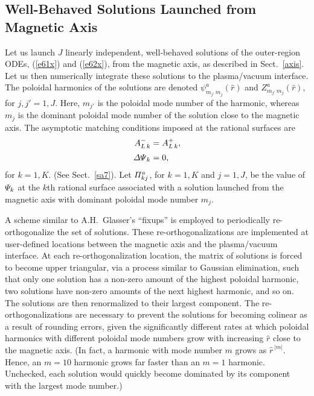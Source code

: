 \documentclass[12pt,prb,aps]{revtex4-1}
\begin{document}
\subsection{Well-Behaved Solutions Launched from Magnetic Axis}\label{axisl}
Let us launch $J$ linearly independent, well-behaved solutions of the outer-region ODEs, (\ref{e61x}) and (\ref{e62x}), from the
magnetic axis, as described in Sect.~\ref{axis}. Let us then numerically integrate these solutions to the plasma/vacuum interface. The poloidal harmonics of
the solutions are denoted $\psi^a_{m_{j'}\,m_j}(\hat{r})$ and $Z^a_{m_{j'}\,m_j}(\hat{r})$, for $j,j'=1,J$. Here,
$m_{j'}$ is the poloidal mode number of the harmonic, whereas $m_j$ is the dominant poloidal mode number of the solution close to the
magnetic axis. The asymptotic matching conditions imposed at the rational surfaces are
\begin{align}
A_{L\,k}^{-} &= A_{L\,k}^+,\\[0.5ex]
{\mit\Delta\Psi}_k &= 0,
\end{align}
for $k=1,K$. (See Sect.~\ref{sa7}). 
Let ${\mit\Pi}_{kj}^a$, for   $k=1,K$ and $j=1,J$,  be the value of ${\mit\Psi}_k$ at the $k$th rational surface associated with a solution launched
from the magnetic axis with dominant poloidal mode number $m_j$. 

A scheme similar to A.H.~Glasser's ``fixups'' \cite{ham} is employed to periodically re-orthogonalize the set of solutions. These  re-orthogonalizations are implemented at user-defined locations between the magnetic axis and the plasma/vacuum interface.  At each re-orthogonalization location, the matrix of solutions is forced to become upper triangular, via a process similar to Gaussian elimination, such that only one solution has a non-zero amount of the highest poloidal  harmonic, two solutions have non-zero amounts of the next highest harmonic, and so on. The solutions are then renormalized to their largest component. 
 The re-orthogonalizations are
 necessary to prevent the solutions for becoming colinear as a result of rounding errors, given the significantly
 different rates at which poloidal harmonics with different poloidal mode numbers grow with increasing $\hat{r}$  close to the magnetic axis. (In fact, a
 harmonic with mode number $m$ grows as $\hat{r}^{\,|m|}$. Hence, an $m=10$ harmonic  grows far faster than an $m=1$ harmonic. Unchecked, each solution
 would quickly become dominated by its component with the largest mode number.)
\end{document}
